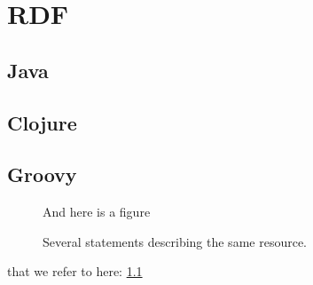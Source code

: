 \documentclass[a4paper,12pt]{kth-mag}
\begin{document}
\appendix
\addappheadtotoc
\chapter{RDF}\label{appA}

\section{Java}

\section{Clojure}

\section{Groovy}

\begin{figure}[ht]
\begin{center}
And here is a figure
\caption{\small{Several statements describing the same resource.}}\label{RDF_4}
\end{center}
\end{figure}

that we refer to here: \ref{RDF_4}

\newpage
\renewcommand{\refname}{\section{References}}



\end{document}
